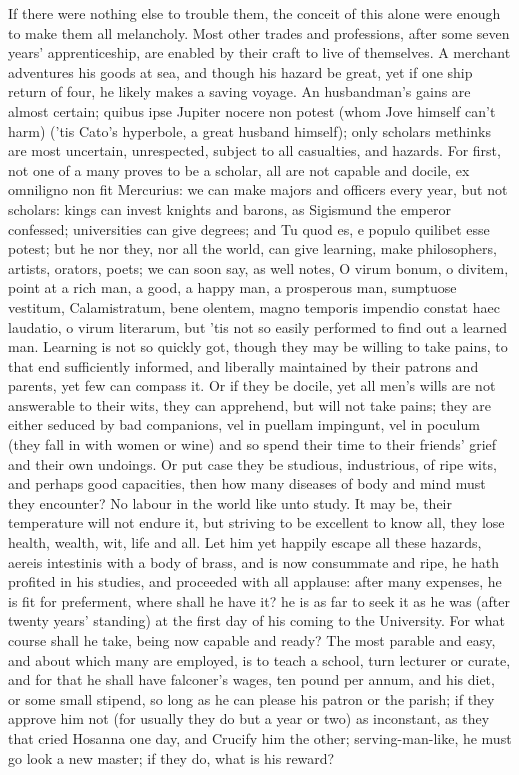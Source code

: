 {If there were nothing else to trouble them, the conceit of this alone
were enough to make them all melancholy. Most other trades and
professions, after some seven years' apprenticeship, are enabled by
their craft to live of themselves. A merchant adventures his goods at
sea, and though his hazard be great, yet if one ship return of four, he
likely makes a saving voyage. An husbandman's gains are almost certain;
quibus ipse Jupiter nocere non potest (whom Jove himself can't harm)
('tis Cato's hyperbole, a great husband himself); only scholars
methinks are most uncertain, unrespected, subject to all casualties,
and hazards. For first, not one of a many proves to be a scholar, all
are not capable and docile, ex omniligno non fit Mercurius: we
can make majors and officers every year, but not scholars: kings can
invest knights and barons, as Sigismund the emperor confessed;
universities can give degrees; and Tu quod es, e populo quilibet esse
potest; but he nor they, nor all the world, can give learning, make
philosophers, artists, orators, poets; we can soon say, as \Seneca well
notes, O virum bonum, o divitem, point at a rich man, a good, a happy
man, a prosperous man, sumptuose vestitum, Calamistratum, bene olentem,
magno temporis impendio constat haec laudatio, o virum literarum, but
'tis not so easily performed to find out a learned man. Learning is not
so quickly got, though they may be willing to take pains, to that end
sufficiently informed, and liberally maintained by their patrons and
parents, yet few can compass it. Or if they be docile, yet all men's
wills are not answerable to their wits, they can apprehend, but will
not take pains; they are either seduced by bad companions, vel in
puellam impingunt, vel in poculum (they fall in with women or wine) and
so spend their time to their friends' grief and their own undoings. Or
put case they be studious, industrious, of ripe wits, and perhaps good
capacities, then how many diseases of body and mind must they
encounter? No labour in the world like unto study. It may be, their
temperature will not endure it, but striving to be excellent to know
all, they lose health, wealth, wit, life and all. Let him yet happily
escape all these hazards, aereis intestinis with a body of brass, and
is now consummate and ripe, he hath profited in his studies, and
proceeded with all applause: after many expenses, he is fit for
preferment, where shall he have it? he is as far to seek it as he was
(after twenty years' standing) at the first day of his coming to the
University. For what course shall he take, being now capable and ready?
The most parable and easy, and about which many are employed, is to
teach a school, turn lecturer or curate, and for that he shall have
falconer's wages, ten pound per annum, and his diet, or some small
stipend, so long as he can please his patron or the parish; if they
approve him not (for usually they do but a year or two) as inconstant,
as they that cried Hosanna one day, and Crucify him the other;
serving-man-like, he must go look a new master; if they do, what is his
reward?

}
